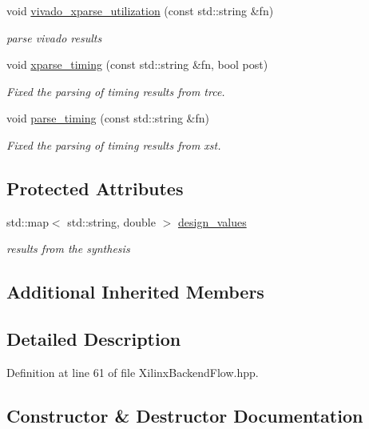 \begin{DoxyCompactItemize}
void \hyperlink{classXilinxBackendFlow_a4606bf711aee0e82892bb50e73eaa6e1}{vivado\+\_\+xparse\+\_\+utilization} (const std\+::string \&fn)
\begin{DoxyCompactList}\small\item\em parse vivado results \end{DoxyCompactList}\item 
void \hyperlink{classXilinxBackendFlow_ad6ce13107d22bc9adc43b9b5e1423e6d}{xparse\+\_\+timing} (const std\+::string \&fn, bool post)
\begin{DoxyCompactList}\small\item\em Fixed the parsing of timing results from trce. \end{DoxyCompactList}\item 
void \hyperlink{classXilinxBackendFlow_a7316d2350ad8ab06e640e91d7b7baad3}{parse\+\_\+timing} (const std\+::string \&fn)
\begin{DoxyCompactList}\small\item\em Fixed the parsing of timing results from xst. \end{DoxyCompactList}\end{DoxyCompactItemize}
\subsection*{Protected Attributes}
\begin{DoxyCompactItemize}
\item 
std\+::map$<$ std\+::string, double $>$ \hyperlink{classXilinxBackendFlow_a043659a1184b608b1993a05a4d61755f}{design\+\_\+values}
\begin{DoxyCompactList}\small\item\em results from the synthesis \end{DoxyCompactList}\end{DoxyCompactItemize}
\subsection*{Additional Inherited Members}


\subsection{Detailed Description}


Definition at line 61 of file Xilinx\+Backend\+Flow.\+hpp.



\subsection{Constructor \& Destructor Documentation}
\mbox{\label{classXilinxBackendFlow_af4ee34fb087640152ee3e79f7153b0ab}} 
